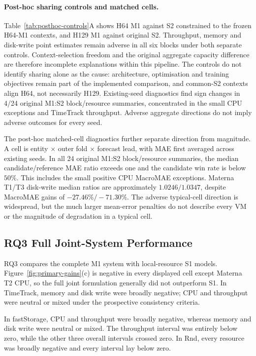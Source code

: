 \documentclass[a4paper,fleqn]{cas-dc}
\begin{document}
\paragraph{Post-hoc sharing controls and matched cells.}
Table~\ref{tab:posthoc-controls}A shows H64 M1 against S2 constrained to the
frozen H64-M1 contexts, and H129 M1 against original S2. Throughput, memory
and disk-write point estimates remain adverse in all six blocks under both
separate controls. Context-selection freedom and the original aggregate
capacity difference are therefore incomplete explanations within this
pipeline. The controls do not identify sharing alone as the cause:
architecture, optimisation and training objectives remain part of the
implemented comparison, and common-S2 contexts align H64, not necessarily
H129. Existing-seed diagnostics find sign changes in 4/24 original M1:S2
block/resource summaries, concentrated in the small CPU exceptions and
TimeTrack throughput. Adverse aggregate directions do not imply adverse
outcomes for every seed.

The post-hoc matched-cell diagnostics further separate direction from
magnitude. A cell is entity $\times$ outer fold $\times$ forecast lead, with
MAE first averaged across existing seeds. In all 24 original M1:S2
block/resource summaries, the median candidate/reference MAE ratio exceeds
one and the candidate win rate is below $50\%$. This includes the small
positive CPU MacroMAE exceptions. Materna T1/T3 disk-write median ratios are
approximately $1.0246/1.0347$, despite MacroMAE gains of
$-27.46\%/-71.30\%$. The adverse typical-cell direction is widespread, but
the much larger mean-error penalties do not describe every VM or the
magnitude of degradation in a typical cell.



\subsection{RQ3 Full Joint-System Performance}
\label{sec:results-rq3}

RQ3 compares the complete M1 system with local-resource S1 models.
Figure~\ref{fig:primary-gains}(c) is negative in every displayed cell except
Materna T2 CPU, so the full joint formulation generally did not outperform S1.
In TimeTrack, memory and disk write were broadly negative; CPU and throughput
were neutral or mixed under the prospective consistency criteria.

In fastStorage, CPU and throughput were broadly negative, whereas memory and
disk write were neutral or mixed. The throughput interval was entirely below
zero, while the other three overall intervals crossed zero. In Rnd, every
resource was broadly negative and every interval lay below zero.
\end{document}
